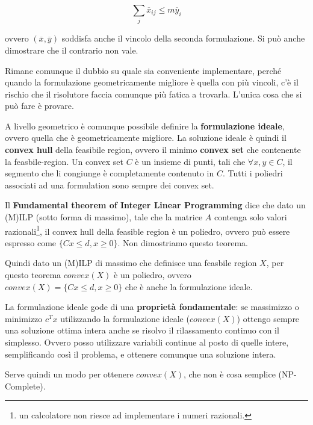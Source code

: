 $$
\sum\limits_{j} \overline{x}_{ij} \leq m \overline{y}_i
$$

ovvero $(\overline{x},\overline{y})$ soddisfa anche il vincolo della seconda formulazione.
Si può anche dimostrare che il contrario non vale.

Rimane comunque il dubbio su quale sia conveniente implementare, perché quando la formulazione geometricamente migliore è quella con più vincoli, c'è il rischio che il risolutore faccia comunque più fatica a trovarla. L'unica cosa che si può fare è provare.

A livello geometrico è comunque possibile definire la \textbf{formulazione ideale}, ovvero quella che è geometricamente migliore.
La soluzione ideale è quindi il \textbf{convex hull} della feasibile region, ovvero il minimo \textbf{convex set} che contenente la feasbile-region.
Un convex set $C$ è un insieme di punti, tali che $\forall x,y \in C$, il segmento che li congiunge è completamente contenuto in $C$.
Tutti i poliedri associati ad una formulation sono sempre dei convex set. 

Il \textbf{Fundamental theorem of Integer Linear Programming} dice che dato un (M)ILP (sotto forma di massimo), tale che la matrice $A$ contenga solo valori razionali\footnote{un calcolatore non riesce ad implementare i numeri razionali.}, il convex hull della feasible region è un poliedro, ovvero può essere espresso come $\{Cx\leq d, x\geq0 \}$. Non dimostriamo questo teorema.

Quindi dato un (M)ILP di massimo che definisce una feasbile region $X$, per questo teorema $convex(X)$ è un poliedro, ovvero $convex(X) = \{Cx\leq d, x \geq 0 \}$ che è anche la formulazione ideale.

La formulazione ideale gode di una \textbf{proprietà fondamentale}: se massimizzo o minimizzo $c^Tx$ utilizzando la formulazione ideale ($convex(X)$) ottengo sempre una soluzione ottima intera anche se risolvo il rilassamento continuo con il simplesso. Ovvero posso utilizzare variabili continue al posto di quelle intere, semplificando così il problema, e ottenere comunque una soluzione intera.

Serve quindi un modo per ottenere $convex(X)$, che non è cosa semplice (NP-Complete).













